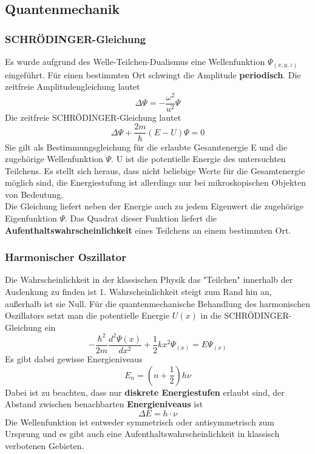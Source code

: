 \documentclass[12pt,a4paper,ngerman]{article}
\begin{document}
\subsection{Quantenmechanik}
\subsubsection{SCHRÖDINGER-Gleichung}

Es wurde aufgrund des Welle-Teilchen-Dualismus eine Wellenfunktion $\Psi_{(x,y,z)}$ eingeführt. Für einen bestimmten Ort schwingt die Amplitude \textbf{periodisch}. Die zeitfreie Amplitudengleichung lautet
\begin{equation}
\Delta \Psi = - \frac{\omega^2}{u^2}\Psi
\end{equation}
Die zeitfreie SCHRÖDINGER-Gleichung lautet
\begin{equation}
\Delta \Psi + \frac{2m}{\hbar}(E-U) \Psi = 0
\end{equation}
Sie gilt als Bestimmungsgleichung für die erlaubte Gesamtenergie E und die zugehörige Wellenfunktion $\Psi$. U ist die potentielle Energie des untersuchten Teilchens. Es stellt sich heraus, dass nicht beliebige Werte für die Gesamtenergie möglich sind, die Energiestufung ist allerdings nur bei mikroskopischen Objekten von Bedeutung. 
\\
Die Gleichung liefert neben der Energie auch zu jedem Eigenwert die zugehörige Eigenfunktion $\Psi$. Das Quadrat dieser Funktion liefert die \textbf{Aufenthaltswahrscheinlichkeit} eines Teilchens an einem bestimmten Ort. 

\subsubsection{Harmonischer Oszillator}
Die Wahrscheinlichkeit in der klassischen Physik das "Teilchen" innerhalb der Auslenkung zu finden ist 1. Wahrscheinlichkeit steigt zum Rand hin an, außerhalb ist sie Null. 
Für die quantenmechanische Behandlung des harmonischen Oszillators setzt man die potentielle Energie $U(x)$ in die SCHRÖDINGER-Gleichung ein
\begin{equation}
-\frac{\hbar^2}{2m}\frac{d^2\Psi(x)}{dx^2} + \frac{1}{2}kx^2\Psi_{(x)} = E\Psi_{(x)}
\end{equation}
Es gibt dabei gewisse Energieniveaus
\begin{equation}
E_n = (n + \frac{1}{2})h\nu
\end{equation}
Dabei ist zu beachten, dass nur \textbf{diskrete Energiestufen} erlaubt sind, der Abstand zwischen benachbarten \textbf{Energieniveaus} ist
\begin{equation}
\Delta E = h \cdot \nu
\end{equation}
Die Wellenfunktion ist entweder symmetrisch oder antisymmetrisch zum Ursprung und es gibt auch eine Aufenthaltswahrscheinlichkeit in klassisch verbotenen Gebieten. 
\end{document}

